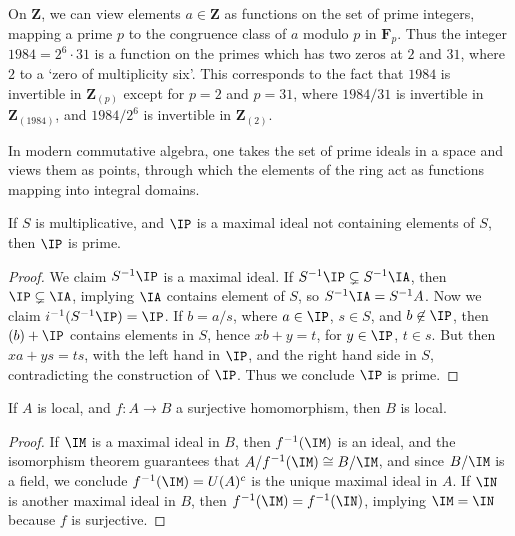 \begin{example}
    On $\mathbf{Z}$, we can view elements $a \in \mathbf{Z}$ as functions on the set of prime integers, mapping a prime $p$ to the congruence class of $a$ modulo $p$ in $\mathbf{F}_p$. Thus the integer $1984 = 2^6 \cdot 31$ is a function on the primes which has two zeros at $2$ and $31$, where $2$ to a `zero of multiplicity six'. This corresponds to the fact that $1984$ is invertible in $\mathbf{Z}_{(p)}$ except for $p = 2$ and $p = 31$, where $1984/31$ is invertible in $\mathbf{Z}_{(1984)}$, and $1984/2^6$ is invertible in $\mathbf{Z}_{(2)}$.
\end{example}

In modern commutative algebra, one takes the set of prime ideals in a space and views them as points, through which the elements of the ring act as functions mapping into integral domains.

\begin{theorem}
    If $S$ is multiplicative, and $\IP$ is a maximal ideal not containing elements of $S$, then $\IP$ is prime.
\end{theorem}
\begin{proof}
    We claim $S^{-1}\IP$ is a maximal ideal. If $S^{-1}\IP \subsetneq S^{-1}\IA$, then $\IP \subsetneq \IA$, implying $\IA$ contains element of $S$, so $S^{-1}\IA = S^{-1}A$. Now we claim $i^{-1}(S^{-1}\IP) = \IP$. If $b = a/s$, where $a \in \IP$, $s \in S$, and $b \not \in \IP$, then $(b) + \IP$ contains elements in $S$, hence $xb + y = t$, for $y \in \IP$, $t \in s$. But then $xa + ys = ts$, with the left hand in $\IP$, and the right hand side in $S$, contradicting the construction of $\IP$. Thus we conclude $\IP$ is prime.
\end{proof}

\begin{prop}
    If $A$ is local, and $f: A \to B$ a surjective homomorphism, then $B$ is local.
\end{prop}
\begin{proof}
    If $\IM$ is a maximal ideal in $B$, then $f^{-1}(\IM)$ is an ideal, and the isomorphism theorem guarantees that $A/f^{-1}(\IM) \cong B/\IM$, and since $B/\IM$ is a field, we conclude $f^{-1}(\IM) = U(A)^c$ is the unique maximal ideal in $A$. If $\IN$ is another maximal ideal in $B$, then $f^{-1}(\IM) = f^{-1}(\IN)$, implying $\IM = \IN$ because $f$ is surjective.
\end{proof}

